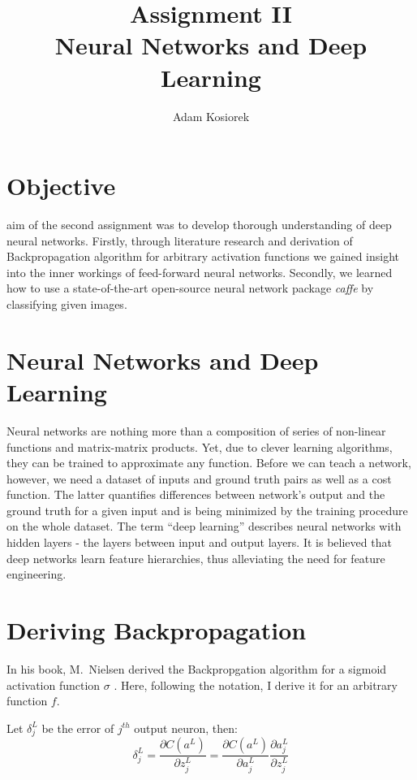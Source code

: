 \documentclass[journal, a4paper]{IEEEtran}
\begin{document}
	\title{Assignment II\\Neural Networks and Deep Learning}
	\author{Adam Kosiorek}	
	\maketitle
	
	
\section{Objective}
     aim of the second assignment was to develop thorough understanding of deep neural networks. Firstly, through literature research and derivation of Backpropagation algorithm for arbitrary activation functions we gained insight into the inner workings of feed-forward neural networks. Secondly, we learned how to use a state-of-the-art open-source neural network package \textit{caffe} \cite{caffe} by classifying given images.

\section{Neural Networks and Deep Learning}
    Neural networks are nothing more than a composition of series of non-linear functions and matrix-matrix products. Yet, due to clever learning algorithms, they can be trained to approximate any function. Before we can teach a network, however, we need a dataset of inputs and ground truth pairs as well as a cost function. The latter quantifies differences between network's output and the ground truth for a given input and is being minimized by the training procedure on the whole dataset. The term ``deep learning'' describes neural networks with hidden layers - the layers between input and output layers. It is believed that deep networks learn feature hierarchies, thus alleviating the need for feature engineering.

\section{Deriving Backpropagation}
    In his book, M.~Nielsen derived the Backpropgation algorithm for a sigmoid activation function $\sigma$ \cite{MLDL}. Here, following the notation, I derive it for an arbitrary function $f$.
    
    Let $\delta_j^L$ be the error of $j^{th}$ output neuron, then:
    \begin{equation}
      \delta_j^L = \frac{\partial C(a^L)}{\partial z_j^L} = \frac{\partial C(a^L)}{\partial a_j^L} \frac{\partial a_j^L}{\partial z_j^L}
    \end{equation}
    
\end{document}
